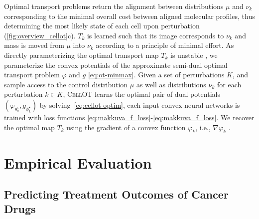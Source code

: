 Optimal transport problems return the alignment between distributions $\mu$ and $\nu_k$ corresponding to the minimal overall cost between aligned molecular profiles, thus determining the most likely state of each cell upon perturbation (\cref{fig:overview_cellot}c).
$T_k$ is learned such that its image corresponds to $\nu_k$ and mass is moved from $\mu$ into $\nu_k$ according to a principle of minimal effort.
As directly parameterizing the optimal transport map $T_k$ \citep{korotin2021wasserstein, yang2018scalable, prasad2020optimal} is unstable \citep[Table 1]{makkuva2020optimal}, we parameterize the convex potentials of the approximate semi-dual optimal transport problem $\varphi$ and $g$ \eqref{eq:ot-minmax}.
Given a set of perturbations $K$, and sample access to the control distribution $\mu$ as well as  distributions $\nu_k$ for each perturbation $k \in K$, \textsc{CellOT} learns the optimal pair of dual potentials $(\varphi_{\theta_k^\star}, g_{\phi_k^\star})$ by solving~\eqref{eq:cellot-optim}, each input convex neural networks \citep{amos2017input} is trained with loss functions \eqref{eq:makkuva_f_loss}-\eqref{eq:makkuva_f_loss}. We recover the optimal map $T_k$ using the gradient of a convex function $\varphi_k$, i.e., $\nabla \varphi_k$ \citep{makkuva2020optimal}.

\section{Empirical Evaluation}

\subsection{Predicting Treatment Outcomes of Cancer Drugs}

